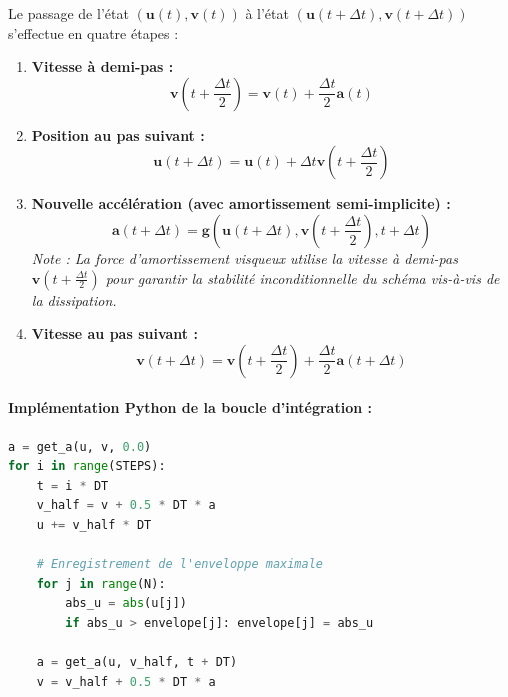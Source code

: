 \documentclass[11pt, a4paper]{report}
\begin{document}
Le passage de l'état $(\mathbf{u}(t), \mathbf{v}(t))$ à l'état $(\mathbf{u}(t+\Delta t), \mathbf{v}(t+\Delta t))$ s'effectue en quatre étapes :
\begin{enumerate}
    \item \textbf{Vitesse à demi-pas :}
    \begin{equation}
        \mathbf{v}\left(t + \frac{\Delta t}{2}\right) = \mathbf{v}(t) + \frac{\Delta t}{2} \mathbf{a}(t)
    \end{equation}
    \item \textbf{Position au pas suivant :}
    \begin{equation}
        \mathbf{u}(t + \Delta t) = \mathbf{u}(t) + \Delta t \mathbf{v}\left(t + \frac{\Delta t}{2}\right)
    \end{equation}
    \item \textbf{Nouvelle accélération (avec amortissement semi-implicite) :}
    \begin{equation}
        \mathbf{a}(t + \Delta t) = \mathbf{g}\left(\mathbf{u}(t + \Delta t), \mathbf{v}\left(t + \frac{\Delta t}{2}\right), t + \Delta t\right)
    \end{equation}
    \textit{Note : La force d'amortissement visqueux utilise la vitesse à demi-pas $\mathbf{v}\left(t + \frac{\Delta t}{2}\right)$ pour garantir la stabilité inconditionnelle du schéma vis-à-vis de la dissipation.}
    \item \textbf{Vitesse au pas suivant :}
    \begin{equation}
        \mathbf{v}(t + \Delta t) = \mathbf{v}\left(t + \frac{\Delta t}{2}\right) + \frac{\Delta t}{2} \mathbf{a}(t + \Delta t)
    \end{equation}
\end{enumerate}

\paragraph{Implémentation Python de la boucle d'intégration :}
\begin{lstlisting}[language=Python]
a = get_a(u, v, 0.0)
for i in range(STEPS):
    t = i * DT
    v_half = v + 0.5 * DT * a
    u += v_half * DT
    
    # Enregistrement de l'enveloppe maximale
    for j in range(N):
        abs_u = abs(u[j])
        if abs_u > envelope[j]: envelope[j] = abs_u
        
    a = get_a(u, v_half, t + DT)
    v = v_half + 0.5 * DT * a
\end{lstlisting}
\end{document}
